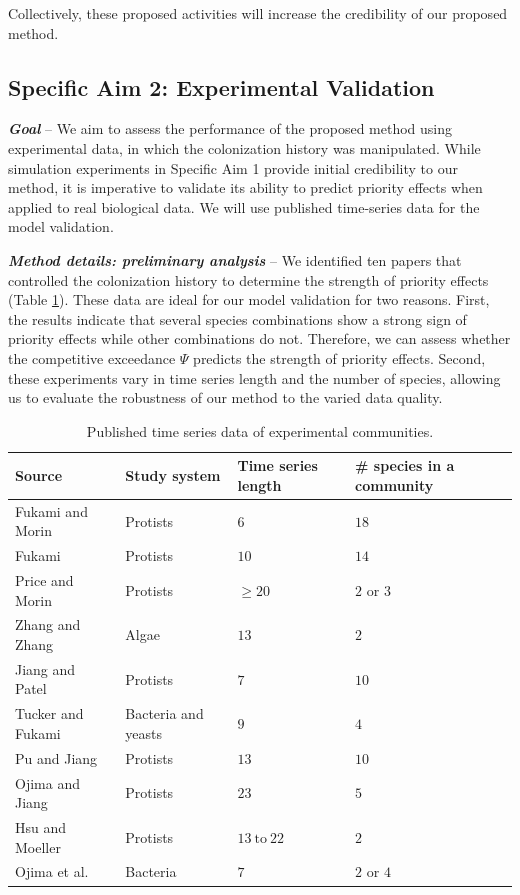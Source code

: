 \documentclass[12pt, class=article, crop=false]{standalone}
\begin{document}
Collectively, these proposed activities will increase the credibility of our proposed method.

\subsection*{Specific Aim 2: Experimental Validation}

\textbf{\textit{Goal}} -- 
We aim to assess the performance of the proposed method using experimental data, in which the colonization history was manipulated.
While simulation experiments in Specific Aim 1 provide initial credibility to our method, it is imperative to validate its ability to predict priority effects when applied to real biological data.
We will use published time-series data for the model validation.

\textit{\textbf{Method details: preliminary analysis}} --
We identified ten papers that controlled the colonization history to determine the strength of priority effects (Table \ref{tab:expdata}).
These data are ideal for our model validation for two reasons.
First, the results indicate that several species combinations show a strong sign of priority effects while other combinations do not.
Therefore, we can assess whether the competitive exceedance $\Psi$ predicts the strength of priority effects.
Second, these experiments vary in time series length and the number of species, allowing us to evaluate the robustness of our method to the varied data quality.

\begin{table}
    \flushleft
    \caption{Published time series data of experimental communities.}
    \begin{tabular}{llll}
         Source & Study system & Time series length & \# species in a community\\
         \hline
         Fukami and Morin \citep{fukami_productivity-biodiversity_2003} & Protists & $6$ & $18$\\
         Fukami \citep{fukami_assembly_2004} & Protists & $10$ & $14$\\
         Price and Morin \citep{price_colonization_2004} & Protists & $\ge 20$ & $2$ or $3$ \\
         Zhang and Zhang \citep{zhang_colonization_2007} & Algae & $13$ & $2$\\
         Jiang and Patel \citep{jiang_community_2008} & Protists & $7$ & $10$\\
         Tucker and Fukami \citep{tucker_environmental_2014} & Bacteria and yeasts & $9$ & $4$\\
         Pu and Jiang \citep{pu_dispersal_2015} & Protists & $13$ & $10$\\
         Ojima and Jiang \citep{ojima_interactive_2017} & Protists & $23$ & $5$\\
         Hsu and Moeller \citep{hsu_metabolic_2021} & Protists & $13~\mbox{to}~22$ & $2$\\
         Ojima et al. \citep{ojima_priority_2022} & Bacteria & $7$ & $2$ or $4$\\
         \hline
    \end{tabular}
    \label{tab:expdata}
\end{table}
\end{document}
